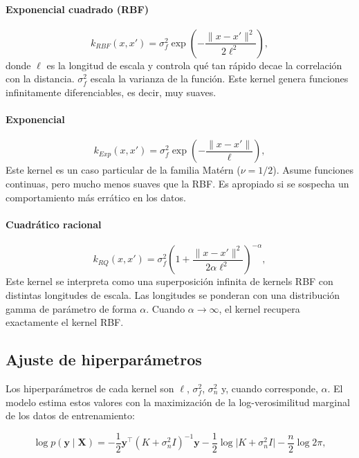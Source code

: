 \paragraph{Exponencial cuadrado (RBF)}
\begin{equation}
k_{RBF}(x,x') = \sigma_f^2 \exp\!\left(-\frac{\lVert x-x' \rVert^2}{2\ell^2}\right),
\label{eq:kernel_rbf}
\end{equation}
donde $\ell$ es la longitud de escala y controla qué tan rápido decae la correlación con la distancia. $\sigma_f^2$ escala la varianza de la función. Este kernel genera funciones infinitamente diferenciables, es decir, muy suaves.

\paragraph{Exponencial}
\begin{equation}
k_{Exp}(x,x') = \sigma_f^2 \exp\!\left(-\frac{\lVert x-x' \rVert}{\ell}\right),
\label{eq:kernel_exp}
\end{equation}
Este kernel es un caso particular de la familia Matérn ($\nu=1/2$). Asume funciones continuas, pero mucho menos suaves que la RBF. Es apropiado si se sospecha un comportamiento más errático en los datos.

\paragraph{Cuadrático racional}
\begin{equation}
k_{RQ}(x,x') = \sigma_f^2 \left(1 + \frac{\lVert x-x' \rVert^2}{2\alpha \ell^2}\right)^{-\alpha},
\label{eq:kernel_rq}
\end{equation}
Este kernel se interpreta como una superposición infinita de kernels RBF con distintas longitudes de escala. Las longitudes se ponderan con una distribución gamma de parámetro de forma $\alpha$. Cuando $\alpha\to\infty$, el kernel recupera exactamente el kernel RBF.

\subsection{Ajuste de hiperparámetros}

Los hiperparámetros de cada kernel son $\ell$, $\sigma_f^2$, $\sigma_n^2$ y, cuando corresponde, $\alpha$. El modelo estima estos valores con la maximización de la log-verosimilitud marginal de los datos de entrenamiento:

\begin{equation}
\log p(\mathbf{y}\mid\mathbf{X}) = -\frac{1}{2}\mathbf{y}^\top(K+\sigma_n^2 I)^{-1}\mathbf{y} - \frac{1}{2}\log\lvert K+\sigma_n^2 I\rvert - \frac{n}{2}\log 2\pi,
\label{eq:gpr_verosimilitud}
\end{equation}


